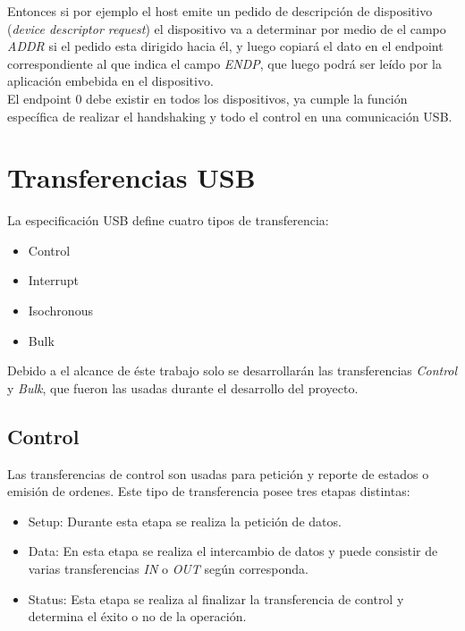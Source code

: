 Entonces si por ejemplo el host emite un pedido de descripci\'on de dispositivo
(\emph{device descriptor request}) el dispositivo va a determinar por medio de
el campo \emph{ADDR} si el pedido esta dirigido hacia \'el, y luego copiar\'a
el dato en el endpoint correspondiente al que indica el campo \emph{ENDP}, que
luego podr\'a ser le\'ido por la aplicaci\'on embebida en el dispositivo.\\

El endpoint 0 debe existir en todos los dispositivos, ya cumple la funci\'on
espec\'ifica de realizar el handshaking y todo el control en una
comunicaci\'on USB. 


\clearpage
\section{Transferencias USB}
La especificaci\'on USB define cuatro tipos de transferencia:

\begin{itemize}
 \item Control
 \item Interrupt
 \item Isochronous 
 \item Bulk
\end{itemize}

Debido a el alcance de \'este trabajo solo se desarrollar\'an las
transferencias \emph{Control} y \emph{Bulk}, que fueron las usadas durante el
desarrollo del proyecto.


\subsection{Control}
Las transferencias de control son usadas para petici\'on y reporte de estados o
emisi\'on de ordenes. Este tipo de transferencia posee tres etapas distintas:

\begin{itemize}
 \item Setup:
		Durante esta etapa se realiza la petici\'on de datos.
 \item Data:
		En esta etapa se realiza el intercambio de datos y puede consistir de
varias transferencias \emph{IN} o \emph{OUT} seg\'un corresponda. 
 \item Status:
		Esta etapa se realiza al finalizar la transferencia de control y
determina el \'exito o no de la operaci\'on.
\end{itemize}


